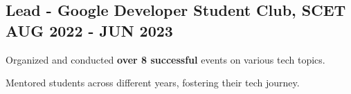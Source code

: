 \documentclass[letter,10pt]{article}
\begin{document}
\subsection{{ {Lead - Google Developer Student Club, SCET} \hfill AUG 2022 - JUN 2023}}
\begin{zitemize}
  \item Organized and conducted \textbf{over 8 successful} events on various tech topics.
  \item Mentored students across different years, fostering their tech journey.
\end{zitemize}
\end{document}
